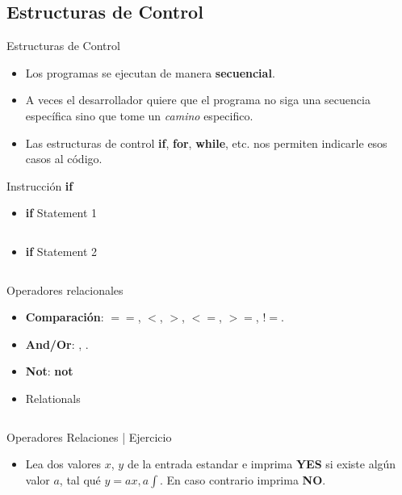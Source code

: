 \documentclass[usenames, dvipsnames, compress]{beamer}
\begin{document}
	\subsection{Estructuras de Control}
	\begin{frame}{Estructuras de Control}
		\begin{itemize}[<+- | alert@ +>]{}
			\item Los programas se ejecutan de manera \textbf{secuencial}.
			\item A veces el desarrollador quiere que el programa no siga una secuencia específica sino que tome un \textit{camino} especifico.
			\item Las estructuras de control \textbf{if}, \textbf{for}, \textbf{while}, etc. nos permiten indicarle esos casos al código. 
		\end{itemize}
	\end{frame}
	\begin{frame}[allowframebreaks]{Instrucción \textbf{if}}
	\begin{itemize}
		\item [] \begin{block}{\textbf{if} Statement 1}
			\inputminted[xleftmargin=\parindent,linenos]{python}{codes/if_statement.m}
		\end{block}
		\pause
		\item [] \begin{block}{\textbf{if} Statement 2}
			\inputminted[xleftmargin=\parindent,linenos]{python}{codes/if_statement2.m}
		\end{block}
	\end{itemize}
	\end{frame}
	\begin{frame}{Operadores relacionales}
	\begin{itemize}
		\item \textbf{Comparación}: $==$, $<$, $>$, $<=$, $>=$, $!=$.
		\pause
		\item \textbf{And/Or}: , .
		\pause
		\item \textbf{Not}: \textbf{not}
		\pause
		\item [] \begin{block}{Relationals}
			\inputminted[xleftmargin=\parindent,linenos]{python}{codes/relational.m}
		\end{block}
	\end{itemize}
	\end{frame}
	\begin{frame}{Operadores Relaciones | Ejercicio}
		\begin{itemize}
		\item Lea dos valores $x$, $y$ de la entrada estandar e imprima \textbf{YES} si existe algún valor $a$, tal qué $y = ax, a\int $. En caso contrario imprima \textbf{NO}.
		\end{itemize}
	\end{frame}
\end{document}
